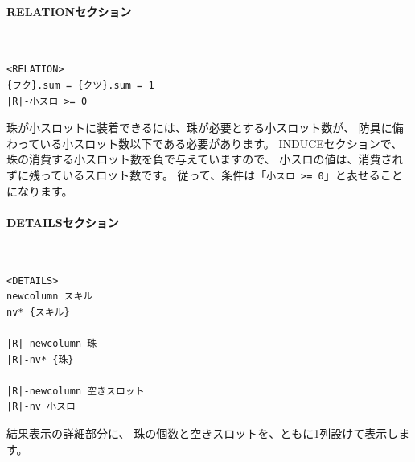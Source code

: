 \documentclass[dvipdfmx]{jsarticle}
\begin{document}
\begin{center}
\end{center}

\paragraph{RELATIONセクション}~\medskip
{\footnotesize\begin{mdframed}\begin{Verbatim}[commandchars=|<>]
<RELATION>
{フク}.sum = {クツ}.sum = 1
|R|-小スロ >= 0
\end{Verbatim}
\end{mdframed}}
\medskip

珠が小スロットに装着できるには、珠が必要とする小スロット数が、
防具に備わっている小スロット数以下である必要があります。
INDUCEセクションで、珠の消費する小スロット数を負で与えていますので、
小スロの値は、消費されずに残っているスロット数です。
従って、条件は「\texttt{小スロ >= 0}」と表せることになります。

\paragraph{DETAILSセクション}~\medskip
{\footnotesize\begin{mdframed}\begin{Verbatim}[commandchars=|<>]
<DETAILS>
newcolumn スキル
nv* {スキル}

|R|-newcolumn 珠
|R|-nv* {珠}

|R|-newcolumn 空きスロット
|R|-nv 小スロ
\end{Verbatim}
\end{mdframed}}
\medskip

結果表示の詳細部分に、
珠の個数と空きスロットを、ともに1列設けて表示します。
\end{document}
